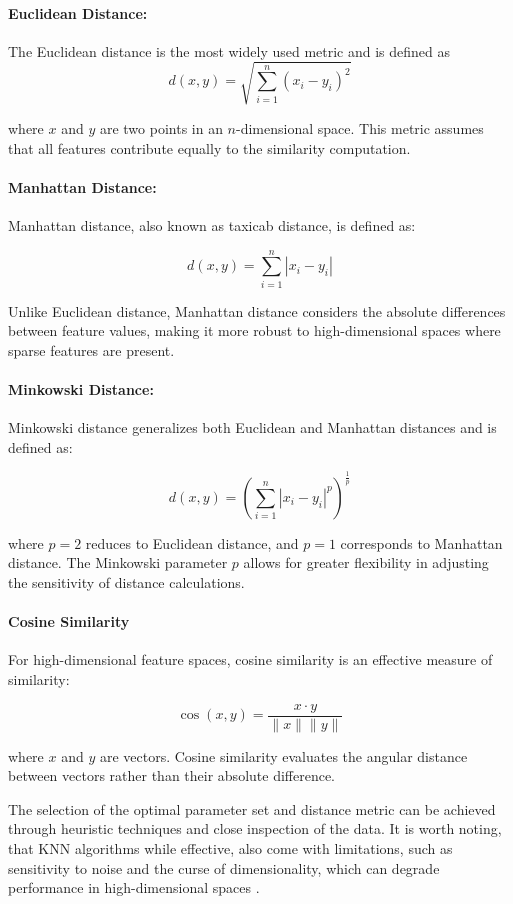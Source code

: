 \documentclass{article}
\begin{document}
\paragraph{Euclidean Distance:}
The Euclidean distance is the most widely used metric and is defined as
\[
d(x, y) = \sqrt{\sum_{i=1}^n (x_i - y_i)^2}
\]

where \( x \) and \( y \) are two points in an \( n \)-dimensional space. This metric assumes that all features contribute equally to the similarity computation.

\paragraph{Manhattan Distance:}
Manhattan distance, also known as taxicab distance, is defined as:

\[
d(x, y) = \sum_{i=1}^n |x_i - y_i|
\]

Unlike Euclidean distance, Manhattan distance considers the absolute differences between feature values, making it more robust to high-dimensional spaces where sparse features are present.

\paragraph{Minkowski Distance:}
Minkowski distance generalizes both Euclidean and Manhattan distances and is defined as:

\[
d(x, y) = \left( \sum_{i=1}^n |x_i - y_i|^p \right)^{\frac{1}{p}}
\]

where \( p = 2 \) reduces to Euclidean distance, and \( p = 1 \) corresponds to Manhattan distance. The Minkowski parameter \( p \) allows for greater flexibility in adjusting the sensitivity of distance calculations.

\paragraph{Cosine Similarity}

For high-dimensional feature spaces, cosine similarity is an effective measure of similarity:

\[
\cos(x, y) = \frac{x \cdot y}{\|x\| \|y\|}
\]

where \( x \) and \( y \) are vectors. Cosine similarity evaluates the angular distance between vectors rather than their absolute difference.

The selection of the optimal parameter set and distance metric can be achieved through heuristic techniques and close inspection of the data. It is worth noting, that KNN algorithms while effective, also come with limitations, such as sensitivity to noise and the curse of dimensionality, which can degrade performance in high-dimensional spaces \cite{ding2017, triguero2019}.
\end{document}
